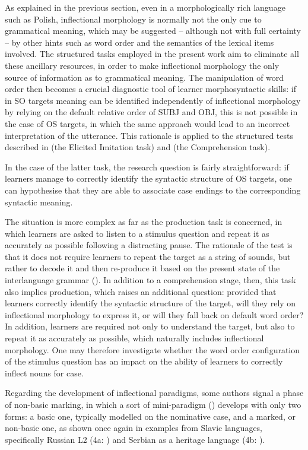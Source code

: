 As explained in the previous section, even in a morphologically rich language such as Polish, inflectional morphology is normally not the only cue to grammatical meaning, which may be suggested – although not with full certainty – by other hints such as word order and the semantics of the lexical items involved. The structured tasks employed in the present work aim to eliminate all these ancillary resources, in order to make inflectional morphology the only source of information as to grammatical meaning. The manipulation of word order then becomes a crucial diagnostic tool of learner morphosyntactic skills: if in SO targets meaning can be identified independently of inflectional morphology by relying on the default relative order of SUBJ and OBJ, this is not possible in the case of OS targets, in which the same approach would lead to an incorrect interpretation of the utterance. This rationale is applied to the structured tests described in  (the Elicited Imitation task) and  (the Comprehension task).

In the case of the latter task, the research question is fairly straightforward: if learners manage to correctly identify the syntactic structure of OS targets, one can hypothesise that they are able to associate case endings to the corresponding syntactic meaning.

The situation is more complex as far as the production task is concerned, in which learners are asked to listen to a stimulus question and repeat it as accurately as possible following a distracting pause. The rationale of the test is that it does not require learners to repeat the target as a string of sounds, but rather to decode it and then re-produce it based on the present state of the interlanguage grammar (). In addition to a comprehension stage, then, this task also implies production, which raises an additional question: provided that learners correctly identify the syntactic structure of the target, will they rely on inflectional morphology to express it, or will they fall back on default word order? In addition, learners are required not only to understand the target, but also to repeat it as accurately as possible, which naturally includes inflectional morphology. One may therefore investigate whether the word order configuration of the stimulus question has an impact on the ability of learners to correctly inflect nouns for case.

Regarding the development of inflectional paradigms, some authors signal a phase of non-basic marking, in which a sort of mini-paradigm (\citealt{BittnerEtAl2000}) develops with only two forms: a basic one, typically modelled on the nominative case, and a marked, or non-basic one, as shown once again in examples from Slavic languages, specifically Russian L2 (4a: \citealt[188]{ArtoniMagnani2015}) and Serbian as a heritage language (4b: \citealt{Di-BiaseBettoni2015}). 

